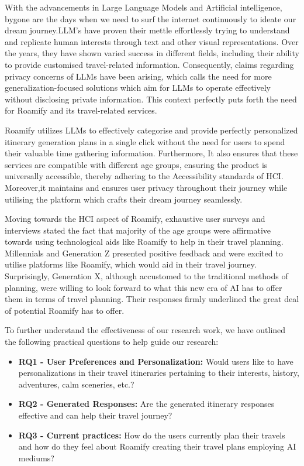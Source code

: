 \documentclass[sigconf,authordraft]{acmart}
\begin{document}
    With the advancements in Large Language Models and Artificial intelligence, bygone are the
    days when we need to surf the internet continuously to ideate our dream journey.LLM’s have
    proven their mettle effortlessly trying to understand and replicate human interests through text and other visual representations. Over the years, they have shown varied success in different fields, including their ability to provide customised travel-related information. Consequently, claims regarding privacy concerns of LLMs have been arising, which calls the need for more generalization-focused solutions which aim for LLMs to operate effectively without disclosing private information. This context perfectly puts forth the need for Roamify and its travel-related services.
    
    Roamify utilizes LLMs to effectively categorise and provide perfectly personalized itinerary
    generation plans in a single click without the need for users to spend their valuable time
    gathering information. Furthermore, It also ensures that these services are compatible with
    different age groups, ensuring the product is universally accessible, thereby adhering to the
    Accessibility standards of HCI. Moreover,it maintains and ensures user privacy throughout their journey while utilising the platform which crafts their dream journey seamlessly.
    
    Moving towards the HCI aspect of Roamify, exhaustive user surveys and interviews stated the
    fact that majority of the age groups were affirmative towards using technological aids like
    Roamify to help in their travel planning. Millennials and Generation Z presented positive
    feedback and were excited to utilise platforms like Roamify, which would aid in their travel
    journey. Surprisingly, Generation X, although accustomed to the traditional methods of planning, were willing to look forward to what this new era of AI has to offer them in terms of travel planning. Their responses firmly underlined the great deal of potential Roamify has to offer.
    
    To further understand the effectiveness of our research work, we have outlined the following
    practical questions to help guide our research:
    
    \begin{itemize}
        \item \textbf{RQ1 - User Preferences and Personalization:} Would users like to have personalizations in their travel itineraries pertaining to their interests, history, adventures, calm sceneries, etc.?
        \item \textbf{RQ2 - Generated Responses:} Are the generated itinerary responses effective and can help their travel journey?
        \item \textbf{RQ3 - Current practices:} How do the users currently plan their travels and how do they feel about Roamify creating their travel plans employing AI mediums?
    \end{itemize}
    
\end{document}
